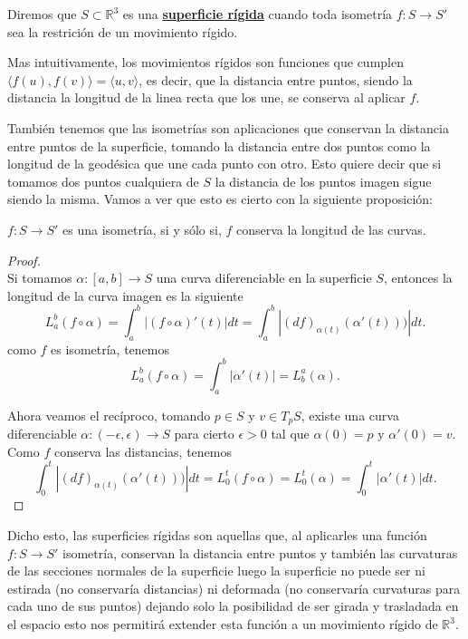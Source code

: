 \begin{definicion}
	Diremos que $S \subset \mathbb{R}^3$ es una \underline{\textbf{superficie rígida}} cuando toda isometría $f : S \to S'$ sea la restrición de un movimiento rígido.
\end{definicion}

Mas intuitivamente, los movimientos rígidos son funciones que cumplen $\langle f(u), f(v) \rangle = \langle u, v \rangle$, es decir, que la distancia entre puntos, siendo la distancia la longitud de la linea recta que los une, se conserva al aplicar $f$.

También tenemos que las isometrías son aplicaciones que conservan la distancia entre puntos de la superficie, tomando la distancia entre dos puntos como la longitud de la geodésica que une cada punto con otro. Esto quiere decir que si tomamos dos puntos cualquiera de $S$ la distancia de los puntos imagen sigue siendo la misma. Vamos a ver que esto es cierto con la siguiente proposición:

\begin{proposicion}
	$f : S \to S'$ es una isometría, si y sólo si, $f$ conserva la longitud de las curvas.
\end{proposicion}

\begin{proof}
	${}$\\
	
	Si tomamos $\alpha : [a,b] \to S$ una curva diferenciable en la superficie $S$, entonces la longitud de la curva imagen es la siguiente
	\[
	L^{b}_{a} (f \circ \alpha) = \int^{b}_{a} |(f \circ \alpha)'(t)| dt = \int^{b}_{a} |(df)_{\alpha(t)}(\alpha'(t)))| dt.
	\]
	como $f$ es isometría, tenemos
	\[
	L^{b}_{a} (f \circ \alpha) = \int^{b}_{a} |\alpha'(t)| = L^{a}_{b} (\alpha).
	\]
	
	Ahora veamos el recíproco, tomando $p \in S$ y $v \in T_p S$, existe una curva diferenciable $\alpha : (-\epsilon, \epsilon) \to S$ para cierto $\epsilon > 0$ tal que $\alpha(0) = p$ y $\alpha'(0) = v$. Como $f$ conserva las distancias, tenemos
	\[
	\int^{t}_{0}|(df)_{\alpha(t)}(\alpha'(t)))| dt = L^{t}_{0} (f \circ \alpha) = L^{t}_{0}(\alpha) = \int^{t}_{0} |\alpha'(t)|dt.
	\]
	
\end{proof}

Dicho esto, las superficies rígidas son aquellas que, al aplicarles una función $f : S \to S'$ isometría, conservan la distancia entre puntos y también las curvaturas de las secciones normales de la superficie luego la superficie no puede ser ni estirada (no conservaría distancias) ni deformada (no conservaría curvaturas para cada uno de sus puntos) dejando solo la posibilidad de ser girada y trasladada en el espacio esto nos permitirá extender esta función a un movimiento rígido de $\mathbb{R}^3$.
${ }$\\



